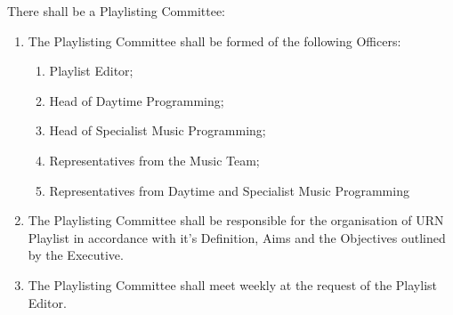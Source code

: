 \item There shall be a Playlisting Committee:
\begin{enumerate}[label*=\arabic*.]
    \item The Playlisting Committee shall be formed of the following Officers:
          \begin{enumerate}[label*=\arabic*.]
              \item Playlist Editor;
              \item Head of Daytime Programming;
              \item Head of Specialist Music Programming;
              \item Representatives from the Music Team;
              \item Representatives from Daytime and Specialist Music Programming
          \end{enumerate}
    \item The Playlisting Committee shall be responsible for the organisation of URN Playlist in accordance with it's Definition, Aims and the Objectives outlined by the Executive.
    \item The Playlisting Committee shall meet weekly at the request of the Playlist Editor.
\end{enumerate}
